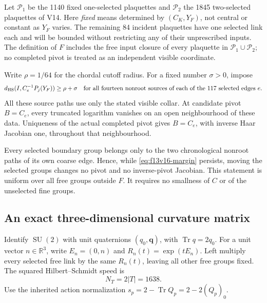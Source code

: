 \documentclass[11pt,oneside]{article}
\DeclareMathOperator{\SU}{SU}
\begin{document}
Let \(\mathcal P_1\) be the 1140 fixed one-selected
plaquettes and \(\mathcal P_2\) the 1845 two-selected
plaquettes of V14. Here \emph{fixed} means determined
by \((C_K,Y_F)\), not central or constant as \(Y_F\)
varies. The remaining 84 incident plaquettes have one
selected link each and will be bounded without
restricting any of their unprescribed inputs.
The definition of \(F\) includes the free input
closure of every plaquette in \(\mathcal P_1\cup
\mathcal P_2\); no completed pivot is treated as an
independent visible coordinate.

Write \(\rho=1/64\) for the chordal cutoff radius.
For a fixed number \(\sigma>0\), impose
\begin{equation}\label{eq:f13v16-margin}
 d_{\rm HS}(I,C_e^{-1}P_j(Y_F))\ge\rho+\sigma
 \quad\text{for all fourteen nonroot sources of
 each of the 117 selected edges }e.
\end{equation}
All these source paths use only the stated visible
collar. At candidate pivot \(B=C_e\), every truncated
logarithm vanishes on an open neighbourhood of these
data. Uniqueness of the actual completed pivot gives
\(B=C_e\), with inverse Haar Jacobian one, throughout
that neighbourhood.

Every selected boundary group belongs only to the
two chronological nonroot paths of its own coarse
edge. Hence, while \eqref{eq:f13v16-margin} persists,
moving the selected groups changes no pivot and no
inverse-pivot Jacobian. This statement is uniform
over all free groups outside \(F\).
It requires no smallness of \(C\) or of the unselected
fine groups.

\subsection{An exact three-dimensional curvature matrix}

Identify \(\SU(2)\) with unit quaternions
\((q_0,\mathbf q)\), with
\(\operatorname{Tr}q=2q_0\).
For a unit vector \(n\in\mathbb R^3\), write
\(E_n=(0,n)\) and \(R_n(t)=\exp(tE_n)\).
Left multiply every selected free link by the same
\(R_n(t)\), leaving all other free groups fixed.
The squared Hilbert--Schmidt speed is
\begin{equation}\label{eq:f13v16-speed}
                         N_T=2|T|=1638.
\end{equation}
Use the inherited action normalization
\(s_p=2-\operatorname{Tr}Q_p=2-2(Q_p)_0\).
\end{document}
